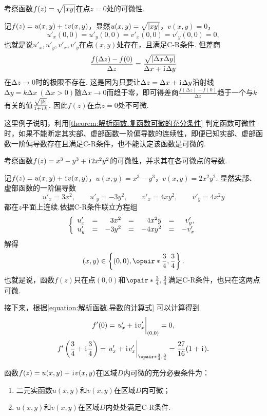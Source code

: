 \begin{example}
考察函数\(f(z) = \sqrt{\abs{xy}}\)在点\(z = 0\)处的可微性.
\begin{solution}
记\(f(z) = u(x,y) + \kern1pt\mathrm{i}\kern1pt v(x,y)\)，显然\(u(x,y) = \sqrt{\abs{xy}}\)，\(v(x,y) = 0\)，\[
u'_x(0,0) = u'_y(0,0) = v'_x(0,0) = v'_y(0,0) = 0,
\]也就是说\(u'_x,u'_y,v'_x,v'_y\)在点\((x,y)\)处存在，且满足C-R条件.
但差商\[
\frac{f(\Delta z) - f(0)}{\Delta z}
= \frac{ \sqrt{ \abs{ \Delta x \Delta y } } }{ \Delta x + \kern1pt\mathrm{i}\kern1pt \Delta y }
\]在\(\increment z \to 0\)时的极限不存在.
这是因为只要让\(\Delta z = \Delta x + \kern1pt\mathrm{i}\kern1pt \Delta y\)沿射线\(\increment y = k \increment x \ (\increment x > 0)\)随\(\increment x \to 0\)而趋于零，即可得差商\(\frac{f(\increment z) - f(0)}{\increment z}\)趋于一个与\(k\)有关的值\(\frac{\sqrt{\abs{k}}}{1 + \kern1pt\mathrm{i}\kern1pt k}\).
因此\(f(z)\)在点\(z = 0\)处不可微.
\end{solution}
这里例子说明，利用\cref{theorem:解析函数.复函数可微的充分条件} 判定函数可微性时，如果不能断定其实部、虚部函数一阶偏导数的连续性，即便已知实部、虚部函数一阶偏导数存在且满足C-R条件，也不能认定该函数是可微的.
\end{example}

\begin{example}
考察函数\(f(z) = x^3 - y^3 + \kern1pt\mathrm{i}\kern1pt 2 x^2 y^2\)的可微性，并求其在各可微点的导数.
\begin{solution}
记\(f(z) = u(x,y) + \kern1pt\mathrm{i}\kern1pt v(x,y)\)，\(u(x,y) = x^3 - y^3\)，\(v(x,y) = 2 x^2 y^2\).
显然实部、虚部函数的一阶偏导数\[
u'_x = 3x^2,
\qquad
u'_y = -3y^2,
\qquad
v'_x = 4xy^2,
\qquad
v'_y = 4x^2y
\]都在\(z\)平面上连续.依据C-R条件联立方程组\[
\left\{ \begin{array}{*7r}
u'_x &=& 3x^2 &=& 4x^2y &=& v'_y, \\
u'_y &=& -3y^2 &=& -4xy^2 &=& -v'_x
\end{array} \right.
\]解得\[
(x,y)\in\left\{ (0,0), \opair*{\frac{3}{4},\frac{3}{4}} \right\}.
\]也就是说，函数\(f(z)\)只在点\((0,0)\)和\(\opair*{\frac{3}{4},\frac{3}{4}}\)满足C-R条件，也只在这两点可微.

接下来，根据\cref{equation:解析函数.导数的计算式} 可以计算得到\[
f'(0) = \eval{u'_x + \iu v'_x}_{(0,0)} = 0,
\]\[
f'\left(\frac{3}{4}+\iu\frac{3}{4}\right)
= \eval{u'_x + \iu v'_x}_{\opair*{\frac{3}{4},\frac{3}{4}}}
= \frac{27}{16} (1+\iu).
\]
\end{solution}
\end{example}

\begin{theorem}\label{theorem:解析函数.函数在区域内处处可微的条件}
函数\(f(z)=u(x,y)+\kern1pt\mathrm{i}\kern1pt v(x,y)\)在区域\(D\)内可微的充分必要条件为：
\begin{enumerate}
\item 二元实函数\(u(x,y)\)和\(v(x,y)\)在区域\(D\)内可微；
\item \(u(x,y)\)和\(v(x,y)\)在区域\(D\)内处处满足C-R条件.
\end{enumerate}
\end{theorem}

